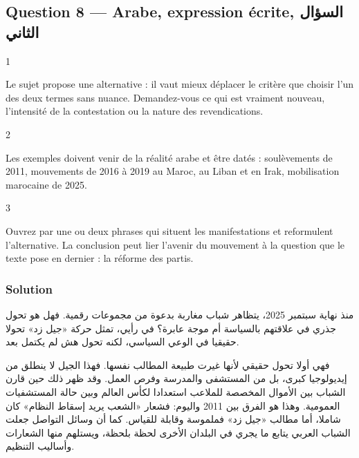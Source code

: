 \documentclass[11pt,a4paper]{article}
\begin{document}
\hypertarget{question-8-arabe-expression-uxe9crite-ux627ux644ux633ux624ux627ux644-ux627ux644ux62bux627ux646ux64a}{%
\subsection{Question 8 --- Arabe, expression écrite, السؤال الثاني}\label{question-8-arabe-expression-uxe9crite-ux627ux644ux633ux624ux627ux644-ux627ux644ux62bux627ux646ux64a}}

\begin{indication}{1}

Le sujet propose une alternative : il vaut mieux déplacer le critère que choisir l'un des deux termes sans nuance. Demandez-vous ce qui est vraiment nouveau, l'intensité de la contestation ou la nature des revendications.

\end{indication}

\begin{indication}{2}

Les exemples doivent venir de la réalité arabe et être datés : soulèvements de 2011, mouvements de 2016 à 2019 au Maroc, au Liban et en Irak, mobilisation marocaine de 2025.

\end{indication}

\begin{indication}{3}

Ouvrez par une ou deux phrases qui situent les manifestations et reformulent l'alternative. La conclusion peut lier l'avenir du mouvement à la question que le texte pose en dernier : la réforme des partis.

\end{indication}

\hypertarget{solution-7}{%
\subsubsection{Solution}\label{solution-7}}

منذ نهاية سبتمبر 2025، يتظاهر شباب مغاربة بدعوة من مجموعات رقمية. فهل هو تحول جذري في علاقتهم بالسياسة أم موجة عابرة؟ في رأيي، تمثل حركة «جيل زد» تحولا حقيقيا في الوعي السياسي، لكنه تحول هش لم يكتمل بعد.

فهي أولا تحول حقيقي لأنها غيرت طبيعة المطالب نفسها. فهذا الجيل لا ينطلق من إيديولوجيا كبرى، بل من المستشفى والمدرسة وفرص العمل. وقد ظهر ذلك حين قارن الشباب بين الأموال المخصصة للملاعب استعدادا لكأس العالم وبين حالة المستشفيات العمومية. وهذا هو الفرق بين 2011 واليوم: فشعار «الشعب يريد إسقاط النظام» كان شاملا، أما مطالب «جيل زد» فملموسة وقابلة للقياس. كما أن وسائل التواصل جعلت الشباب العربي يتابع ما يجري في البلدان الأخرى لحظة بلحظة، ويستلهم منها الشعارات وأساليب التنظيم.
\end{document}
